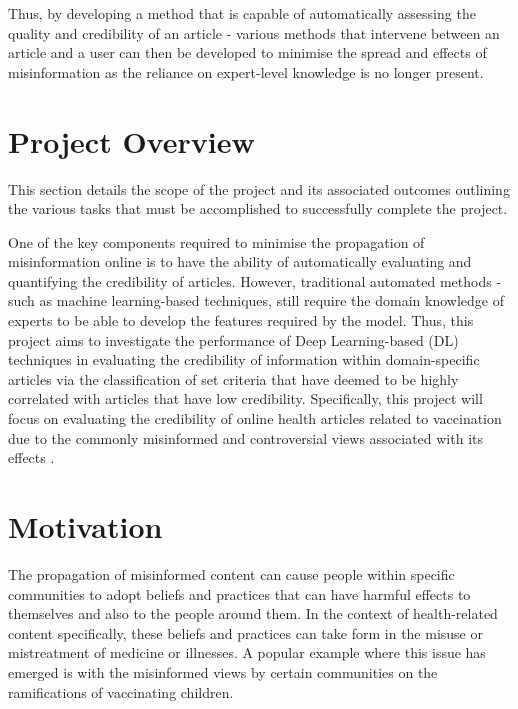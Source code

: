 \documentclass[a4paper,twoside,phd]{BYUPhys}
\begin{document}
Thus, by developing a method that is capable of automatically assessing the quality and credibility of an article - various methods that intervene between an article and a user can then be developed to minimise the spread and effects of misinformation as the reliance on expert-level knowledge is no longer present.

\section{Project Overview}
\label{sec:ProjectOverview}
This section details the scope of the project and its associated outcomes outlining the various tasks that must be accomplished to successfully complete the project.

One of the key components required to minimise the propagation of misinformation online is to have the ability of automatically evaluating and quantifying the credibility of articles. However, traditional automated methods - such as machine learning-based techniques, still require the domain knowledge of experts to be able to develop the features required by the model. Thus, this project aims to investigate the performance of Deep Learning-based (DL) techniques in evaluating the credibility of information within domain-specific articles via the classification of set criteria that have deemed to be highly correlated with articles that have low credibility. Specifically, this project will focus on evaluating the credibility of online health articles related to vaccination due to the commonly misinformed and controversial views associated with its effects \cite{Burgess2006}. \newline

\section{Motivation}
\label{sec:Motivation}
The propagation of misinformed content can cause people within specific communities to adopt beliefs and practices that can have harmful effects to themselves and also to the people around them. In the context of health-related content specifically, these beliefs and practices can take form in the misuse or mistreatment of medicine or illnesses. A popular example where this issue has emerged is with the misinformed views by certain communities on the ramifications of vaccinating children. \newline
\end{document}
